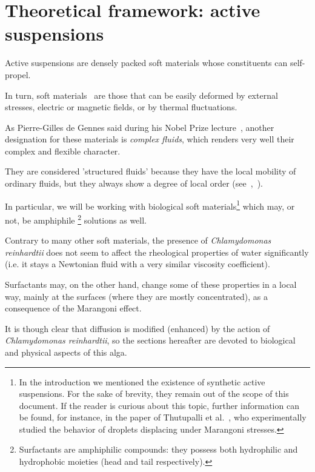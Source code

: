 \chapter{Theoretical framework: active suspensions}
\label{active_suspensions}

Active suspensions are densely packed soft materials whose constituents can self-propel.

In turn, soft materials~\cite{Soft_materials} are those that can be easily deformed by external stresses, electric or magnetic fields, or by thermal fluctuations. 

As Pierre-Gilles de Gennes said during his Nobel Prize lecture~\cite{PGG}, another designation for these materials is \textit{complex fluids}, which renders very well their complex and flexible character.

They are considered 'structured fluids' because they have the local mobility of ordinary fluids, but they always show a degree of local order (see~\cite{soft_matter},~\cite{Hamley}).

In particular, we will be working with biological soft materials\footnote{In the introduction we mentioned the existence of synthetic active suspensions. For the sake of brevity, they remain out of the scope of this document. If the reader is curious about this topic, further information can be found, for instance, in the paper of Thutupalli et al.~\cite{Thutupalli}, who experimentally studied the behavior of droplets displacing under Marangoni stresses.} which may, or not, be amphiphile \footnote{Surfactants are amphiphilic compounds: they possess both hydrophilic and hydrophobic moieties (head and tail respectively).} solutions as well.

Contrary to many other soft materials, the presence of \textit{Chlamydomonas reinhardtii} does not seem to affect the rheological properties of water significantly (i.e. it stays a Newtonian fluid with a very similar viscosity coefficient).


Surfactants may, on the other hand, change some of these properties in a local way, mainly at the surfaces (where they are mostly concentrated), as a consequence of the Marangoni effect.

It is though clear that diffusion is modified (enhanced) by the action of \textit{Chlamydomonas reinhardtii}, so the sections hereafter are devoted to biological and physical aspects of this alga.

